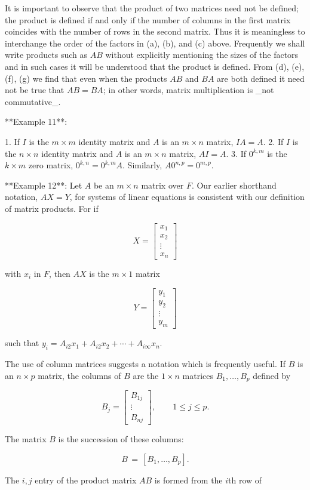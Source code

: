 It is important to observe that the product of two matrices need not be defined; the product is defined if and only if the number of columns in the first matrix coincides with the number of rows in the second matrix. Thus it is meaningless to interchange the order of the factors in (a), (b), and (c) above. Frequently we shall write products such as \(AB\) without explicitly mentioning the sizes of the factors and in such cases it will be understood that the product is defined. From (d), (e), (f), (g) we find that even when the products \(AB\) and \(BA\) are both defined it need not be true that \(AB=BA\); in other words, matrix multiplication is _not commutative_.

**Example 11**:

1. If \(I\) is the \(m\times m\) identity matrix and \(A\) is an \(m\times n\) matrix, \(IA=A\).
2. If \(I\) is the \(n\times n\) identity matrix and \(A\) is an \(m\times n\) matrix, \(AI=A\).
3. If \(0^{k,m}\) is the \(k\times m\) zero matrix, \(0^{k,n}=0^{k,m}A\). Similarly, \(A0^{n,p}=0^{m,p}\).

**Example 12**: Let \(A\) be an \(m\times n\) matrix over \(F\). Our earlier shorthand notation, \(AX=Y\), for systems of linear equations is consistent with our definition of matrix products. For if

\[X=\begin{bmatrix}x_{1}\\ x_{2}\\ \vdots\\ x_{n}\end{bmatrix}\]

with \(x_{i}\) in \(F\), then \(AX\) is the \(m\times 1\) matrix

\[Y=\begin{bmatrix}y_{1}\\ y_{2}\\ \vdots\\ y_{m}\end{bmatrix}\]

such that \(y_{i}=A_{i2}x_{1}+A_{i2}x_{2}+\cdots+A_{i\infty}x_{n}\).

The use of column matrices suggests a notation which is frequently useful. If \(B\) is an \(n\times p\) matrix, the columns of \(B\) are the \(1\times n\) matrices \(B_{1},\ldots,B_{p}\) defined by

\[B_{j}=\begin{bmatrix}B_{1j}\\ \vdots\\ B_{nj}\end{bmatrix},\qquad 1\leq j\leq p.\]

The matrix \(B\) is the succession of these columns:

\[B\,=\,[B_{1},\ldots,B_{p}].\]

The \(i,j\) entry of the product matrix \(AB\) is formed from the \(i\)th row of 